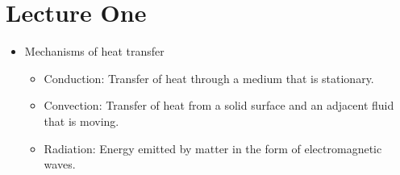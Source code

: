 \section{Lecture One}
\begin{itemize}
    \item Mechanisms of heat transfer 
    \begin{itemize}
        \item Conduction: Transfer of heat through a medium that is stationary.
        \item Convection: Transfer of heat from a solid surface and an adjacent fluid that is moving.
        \item Radiation: Energy emitted by matter in the form of electromagnetic waves.
    \end{itemize}

\end{itemize}
